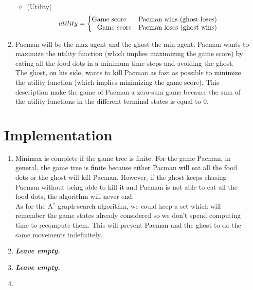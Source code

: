 \documentclass{article}
\begin{document}
\begin{enumerate}[label=\alph*.,leftmargin=*]
\begin{itemize}
			\item (Utility) \begin{equation}
  										utility=\left\{
    										\begin{array}{@{} l c @{}}
      											\text{Game score} & \text{Pacman wins (ghost loses)}\\
      											-\text{Game score} & \text{Pacman loses (ghost wins)}
    										\end{array}\right.
  										\label{eq4}
									\end{equation}
    	\end{itemize}
    	
    \item Pacman will be the max agent and the ghost the min agent. Pacman wants to maximize the utility function (which implies maximizing the game score) by eating all the food dots in a minimum time steps and avoiding the ghost.\\
          The ghost, on his side, wants to kill Pacman as fast as possible to minimize the utility function (which implies minimizing the game score). This description make the game of Pacman a zero-sum game because the sum of the utility functions in the different terminal states is equal to 0.
\end{enumerate}

\section{Implementation}

\begin{enumerate}[label=\alph*.,leftmargin=*]
    \item Minimax is complete if the game tree is finite. For the game Pacman, in general, the game tree is finite because either Pacman will eat all the food dots or the ghost will kill Pacman. However, if the ghost keeps chasing Pacman without being able to kill it and Pacman is not able to eat all the food dots, the algorithm will never end.\\
    As for the A$^*$ graph-search algorithm, we could keep a set which will remember the game states already considered so we don't spend computing time to recompute them. This will prevent Pacman and the ghost to do the same movements indefinitely.
    \item \textbf{\textit{Leave empty.}}
    \item \textbf{\textit{Leave empty.}}
    \item
\end{enumerate}
\end{document}
